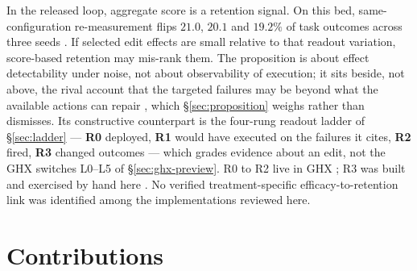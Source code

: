 In the released loop, aggregate score is a retention signal. On this bed,
same-configuration re-measurement flips $21.0$, $20.1$ and $19.2\%$ of task
outcomes across three seeds . If selected edit effects are small
relative to that readout variation, score-based retention may mis-rank them. The
proposition is about effect detectability under noise, not about
observability of execution; it sits beside, not above, the rival account
that the targeted failures may be beyond what the available actions can repair , which
\S\ref{sec:proposition} weighs rather than dismisses. Its constructive
counterpart is the four-rung readout ladder of \S\ref{sec:ladder} ---
\textbf{R0} deployed, \textbf{R1} would have executed on the failures it
cites, \textbf{R2} fired, \textbf{R3} changed outcomes --- which grades
evidence about an edit, not the GHX switches L0--L5 of
\S\ref{sec:ghx-preview}. R0 to R2 live in GHX ; R3 was built
and exercised by hand here . No verified treatment-specific
efficacy-to-retention link was identified among the implementations
reviewed here.

\section{Contributions}
\label{sec:contributions}

